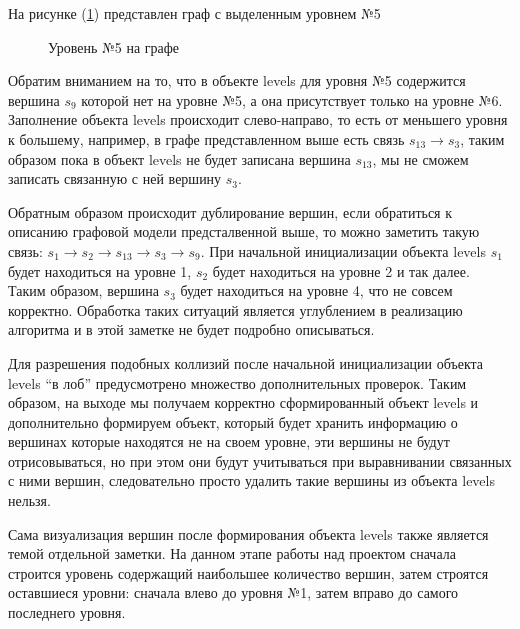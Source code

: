 На рисунке (\ref{fig:main_graph_level5}) представлен граф с выделенным уровнем №5
\begin{figure}[h!]
\caption{Уровень №5 на графе}
\label{fig:main_graph_level5}
\end{figure}


Обратим вниманием на то, что в объекте levels для уровня №5 содержится вершина $s_9$ которой нет на уровне №5, а она присутствует только на уровне №6. Заполнение объекта levels происходит слево-направо, то есть от меньшего
уровня к большему, например, в графе представленном выше есть связь $s_{13} \rightarrow s_3$, таким образом пока в объект levels не будет записана вершина $s_{13}$, мы не сможем записать связанную с ней вершину $s_3$.

Обратным образом происходит дублирование вершин, если обратиться к описанию графовой модели предсталвенной выше, то можно заметить такую связь: $s_1 \rightarrow s_2 \rightarrow s_{13} \rightarrow s_3 \rightarrow s_9$. При начальной инициализации объекта levels $s_1$ будет находиться на уровне 1, $s_2$ будет находиться на уровне 2 и так далее. Таким образом, вершина $s_3$ будет находиться на уровне 4, что не совсем корректно. Обработка таких ситуаций является углублением в реализацию алгоритма и в этой заметке не будет подробно описываться.

Для разрешения подобных коллизий после начальной инициализации объекта levels ``в лоб'' предусмотрено множество дополнительных проверок. Таким образом, на выходе мы получаем корректно сформированный объект levels и дополнительно формируем объект, который будет хранить информацию о вершинах которые находятся не на своем уровне, эти вершины не будут отрисовываться, но при этом они будут учитываться при выравнивании связанных с ними вершин, следовательно просто удалить такие вершины из объекта levels нельзя.

Сама визуализация вершин после формирования объекта levels также является темой отдельной заметки. На данном этапе работы над проектом сначала строится уровень содержащий наибольшее количество вершин, затем строятся оставшиеся уровни: сначала влево до уровня №1, затем вправо до самого последнего уровня.





